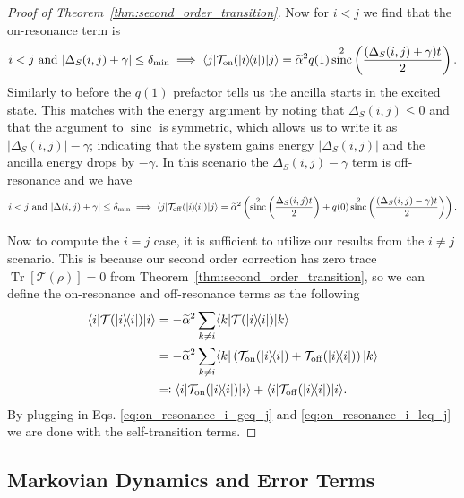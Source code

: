 \documentclass[
 amsmath,amssymb,
 aps,
onecolumn, 
nofootinbib]{revtex4-2}
\newcommand{\on}{\rm on}
\newcommand{\off}{\rm off}
\newcommand{\ket}[1]{|#1\rangle}
\newcommand{\bra}[1]{\langle #1|}
\newcommand{\ketbra}[2]{| #1\rangle\! \langle #2|}
\newcommand{\brackets}[1]{\left[ #1 \right]}
\DeclareMathOperator{\Tr}{Tr}
\newcommand{\trace}[1]{\Tr \brackets{ #1 }}
\DeclareMathOperator{\sinc}{sinc}
\begin{document}
\begin{proof}[Proof of Theorem~\ref{thm:second_order_transition}]
    Now for $i < j$ we find that the on-resonance term is 
    \begin{equation}
    i < j \text{ and } |\Delta_S(i,j) + \gamma| \le \delta_{\min} \implies \bra{j} \mathcal{T}_{\on}(\ketbra{i}{i}) \ket{j} = \widetilde{\alpha}^2 q(1) \sinc^2 \left( \frac{(\Delta_S(i,j) + \gamma)t}{2} \right). \label{eq:on_resonance_i_leq_j}
    \end{equation}
    Similarly to before the $q(1)$ prefactor tells us the ancilla starts in the excited state. This matches with the energy argument by noting that $\Delta_S(i,j) \le 0$ and that the argument to $\sinc$ is symmetric, which allows us to write it as $|\Delta_S(i,j)| - \gamma$; indicating that the system gains energy $|\Delta_S(i,j)|$ and the ancilla energy drops by $-\gamma$. In this scenario the $\Delta_S(i,j) - \gamma$ term is off-resonance and we have
    \begin{align}
        i < j \text{ and } |\Delta(i,j) + \gamma| \le \delta_{\min} \implies  \bra{j} \mathcal{T}_{\off}(\ketbra{i}{i}) \ket{j} = \widetilde{\alpha}^2\left( \sinc^2 \left( \frac{\Delta_S(i,j) t}{2} \right) + q(0) \sinc^2 \left(\frac{(\Delta_S(i,j) - \gamma) t}{2} \right) \right).
    \end{align}


    Now to compute the $i = j$ case, it is sufficient to utilize our results from the $i \neq j$ scenario. This is because our second order correction has zero trace $\trace{\mathcal{T}(\rho)} = 0$ from Theorem~\ref{thm:second_order_transition}, so we can define the on-resonance and off-resonance terms as the following
    \begin{align}
        \bra{i} \mathcal{T}(\ketbra{i}{i}) \ket{i} &= - \widetilde{\alpha}^2 \sum_{k \neq i} \bra{k} \mathcal{T}(\ketbra{i}{i}) \ket{k} \\
        &= - \widetilde{\alpha}^2 \sum_{k \neq i} \bra{k} \left( \mathcal{T}_{\on}(\ketbra{i}{i}) + \mathcal{T}_{\off}(\ketbra{i}{i}) \right) \ket{k} \\
        &\eqqcolon  \bra{i} \mathcal{T}_{\on}(\ketbra{i}{i}) \ket{i} + \bra{i} \mathcal{T}_{\off}(\ketbra{i}{i}) \ket{i}.
    \end{align}
    By plugging in Eqs. \eqref{eq:on_resonance_i_geq_j} and \eqref{eq:on_resonance_i_leq_j} we are done with the self-transition terms. 
\end{proof}



\subsection{Markovian Dynamics and Error Terms} \label{sec:markov}
\end{document}
